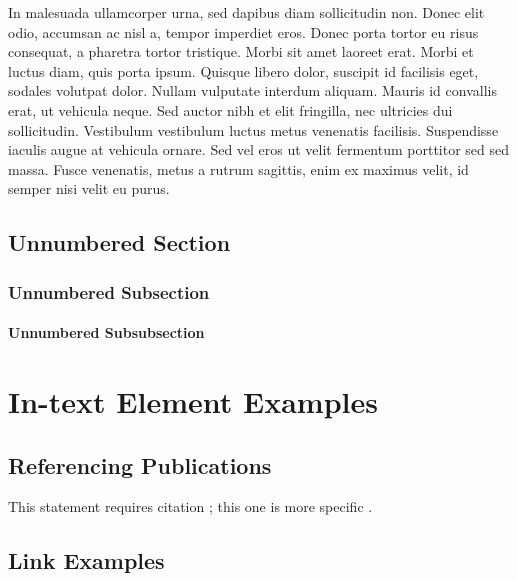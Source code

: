 \documentclass[
	11pt,
	fleqn,
	a4paper,
]{LegrandOrangeBook}
\begin{document}
In malesuada ullamcorper urna, sed dapibus diam sollicitudin non. Donec elit odio, accumsan ac nisl a, tempor imperdiet eros. Donec porta tortor eu risus consequat, a pharetra tortor tristique. Morbi sit amet laoreet erat. Morbi et luctus diam, quis porta ipsum. Quisque libero dolor, suscipit id facilisis eget, sodales volutpat dolor. Nullam vulputate interdum aliquam. Mauris id convallis erat, ut vehicula neque. Sed auctor nibh et elit fringilla, nec ultricies dui sollicitudin. Vestibulum vestibulum luctus metus venenatis facilisis. Suspendisse iaculis augue at vehicula ornare. Sed vel eros ut velit fermentum porttitor sed sed massa. Fusce venenatis, metus a rutrum sagittis, enim ex maximus velit, id semper nisi velit eu purus.


\section*{Unnumbered Section}

\subsection*{Unnumbered Subsection}

\subsubsection*{Unnumbered Subsubsection}


\chapter{In-text Element Examples}

\section{Referencing Publications}

This statement requires citation \cite{Smith:2022jd}; this one is more specific \cite[162]{Smith:2021qr}.


\section{Link Examples}
\end{document}
